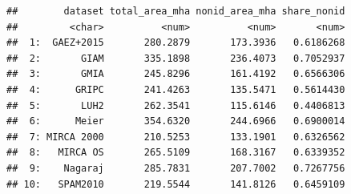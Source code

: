 \documentclass[
  11pt,
]{article}
\begin{document}
\begin{verbatim}
##        dataset total_area_mha nonid_area_mha share_nonid
##         <char>          <num>          <num>       <num>
##  1:  GAEZ+2015       280.2879       173.3936   0.6186268
##  2:       GIAM       335.1898       236.4073   0.7052937
##  3:       GMIA       245.8296       161.4192   0.6566306
##  4:      GRIPC       241.4263       135.5471   0.5614430
##  5:       LUH2       262.3541       115.6146   0.4406813
##  6:      Meier       354.6320       244.6966   0.6900014
##  7: MIRCA 2000       210.5253       133.1901   0.6326562
##  8:   MIRCA OS       265.5109       168.3167   0.6339352
##  9:    Nagaraj       285.7831       207.7002   0.7267756
## 10:   SPAM2010       219.5544       141.8126   0.6459109
\end{verbatim}
\end{document}
